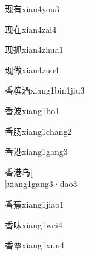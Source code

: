 \begin{verbete}[8;6]{现有}{xian4you3}
\end{verbete}

\begin{verbete}[8;6]{现在}{xian4zai4}
\end{verbete}

\begin{verbete}[8;7]{现抓}{xian4zhua1}
\end{verbete}

\begin{verbete}[8;11]{现做}{xian4zuo4}
\end{verbete}

\begin{verbete}[9;14;10]{香槟酒}{xiang1bin1jiu3}
\end{verbete}

\begin{verbete}[9;8]{香波}{xiang1bo1}
\end{verbete}

\begin{verbete}[9;7]{香肠}{xiang1chang2}
\end{verbete}

\begin{verbete*}[9;12]{香港}{xiang1gang3}
\end{verbete*}

\begin{verbete*}[9;12;7]{香港岛}[\\]{xiang1gang3·dao3}
\end{verbete*}

\begin{verbete}[9;15]{香蕉}{xiang1jiao1}
\end{verbete}

\begin{verbete}[9;8]{香味}{xiang1wei4}
\end{verbete}

\begin{verbete}[9;15]{香蕈}{xiang1xun4}
\end{verbete}

